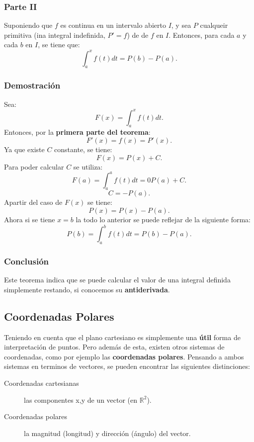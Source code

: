 \documentclass[a4paper]{book}
\begin{document}
\subsubsection{Parte II}
Suponiendo que \(f\) es continua en un intervalo abierto \(I\), y sea \(P\) cualqueir primitiva (ina integral indefinida, \(P'=f\)) de de \(f\) en \(I\). Entonces, para cada \(a\) y cada \( b\) en \(I\), se tiene que:
\[
\int_{a}^{x} f\left(t\right) dt = P\left(b\right) - P\left(a\right)
.\]

\subsubsection{Demostración}

Sea:
\[
F\left( x \right) =\int_{a}^{x} f\left(t\right) dt
.\]
Entonces, por la \textbf{primera parte del teorema}:
\[
F'\left(x\right) = f\left( x \right) = P'\left( x \right)
.\]
Ya que existe \(C\) constante, se tiene:
\[
F\left(x\right)=P\left(x\right)+C
.\]
Para poder calcular \(C\) se utiliza:
\[
F\left(a\right)=\int_{a}^{a} f\left(t\right) dt = 0 P\left(a\right)+C
.\]
\[
C = -P\left(a\right)
.\]
Apartir del caso de \(F\left(x\right)\) se tiene:
\[
P\left(x\right) = P\left(x\right) - P\left(a\right)
.\]
Ahora si se tiene \(x=b \) la todo lo anterior se puede reflejar de la
siguiente forma:
\[
P\left(b\right) = \int_{a}^{b}f\left(t \right) dt = P\left(b\right) - P\left(a\right)
.\]

\subsubsection{Conclusión}

Este teorema indica que se puede calcular el valor de una integral definida
simplemente restando, si conocemos su \textbf{antiderivada}.


\subsection{Coordenadas Polares}
\label{ssec:coordenadas_polares}

Teniendo en cuenta que el plano cartesiano es simplemente una \textbf{útil}
forma de interpretación de puntos. Pero además de esta, existen otros sistemas de coordenadas, como por ejemplo las \textbf{coordenadas polares}. Pensando a ambos sistemas en terminos de vectores, se pueden encontrar las siguientes distinciones:

\begin{description}
    \item[Coordenadas cartesianas] las componentes x,y de un vector (en \(\mathbb{R}^{2}\)).
    \item [Coordenadas polares] la magnitud (longitud) y dirección (ángulo) del vector.
\end{description}
\end{document}
